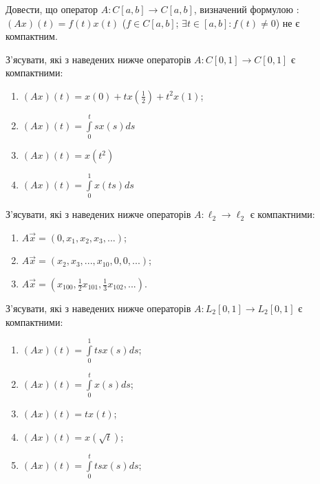 
\begin{exercise}
    Довести, що оператор $A: C[a, b] \rightarrow C[a, b]$, визначений формулою : $(Ax)(t) = 
    f(t)x(t)$ ($f \in C[a, b]$; $\exists t \in [a, b] : f(t) \neq 0$) не є компактним.
\end{exercise}

\begin{exercise}
    З'ясувати, які з наведених нижче операторів $A : C[0, 1] \rightarrow C[0, 1]$ 
    є компактними:
    \begin{enumerate}
        \item $(Ax)(t) = x(0) + tx(\frac{1}{2}) + t^2 x(1)$;
        \item $(Ax)(t) = \int\limits_0^t sx(s) ds$
        \item $(Ax)(t) = x(t^2)$
        \item $(Ax)(t) = \int\limits_0^1 x(ts) ds$
    \end{enumerate}
\end{exercise}

\begin{exercise}
    З'ясувати, які з наведених нижче операторів $A : \ell_2 \rightarrow \ell_2$ 
    є компактними:
    \begin{enumerate}
        \item $A\vec{x} = (0, x_1, x_2, x_3, ...)$;
        \item $A\vec{x} = (x_2, x_3, ..., x_{10}, 0, 0, ...)$;
        \item $A\vec{x} = (x_{100}, \frac{1}{2}x_{101} ,\frac{1}{3}x_{102}, ...)$.
    \end{enumerate}
\end{exercise}

\begin{exercise}
    З'ясувати, які з наведених нижче операторів $A : L_2[0, 1] \rightarrow L_2[0, 1]$ 
    є компактними:
    \begin{enumerate}
        \item $(Ax)(t) = \int\limits_0^1 tsx(s) ds$;
        \item $(Ax)(t) = \int\limits_0^t x(s) ds$;
        \item $(Ax)(t) = t x(t)$;
        \item $(Ax)(t) = x(\sqrt{t})$;
        \item $(Ax)(t) = \int\limits_0^t tsx(s) ds$;
    \end{enumerate}
\end{exercise}

